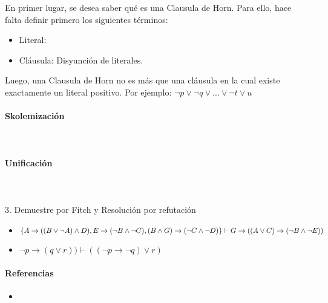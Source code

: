 \documentclass{article}
\begin{document}
En primer lugar, se desea saber qu\'e es una Clausula de Horn. Para ello, hace falta definir primero los siguientes t\'erminos:

\begin{itemize}

\item Literal:
\item Cl\'ausula: Disyunci\'on de literales.

\end{itemize}

Luego, una Clausula de Horn no es m\'as que una cl\'ausula en la cual existe exactamente un literal positivo. Por ejemplo: $ \neg p \lor \neg q \lor ... \lor \neg t \lor u$ 

\paragraph{Skolemizaci\'on}\mbox{}\\


\paragraph{Unificaci\'on}\mbox{}\\


\paragraph{}

3. Demuestre por Fitch y Resoluci\'on por refutaci\'on

\begin{itemize}

	\item $\{A \rightarrow (( B \lor \neg A) \land D), E \rightarrow (\neg B \land \neg C), (B \land G) \rightarrow (\neg C \land \neg D)\} \\ \vdash G  \rightarrow ((A \lor C) \rightarrow ( \neg B \land \neg E))$
	
	\item  $\neg p \rightarrow (q \lor r)) \vdash ((\neg p \rightarrow \neg q) \lor r)$ 
	
\end{itemize}

\begin{prooftree}
\end{prooftree}


\paragraph{Referencias} 

\begin{itemize}

\item 

\end{itemize}
\end{document}
